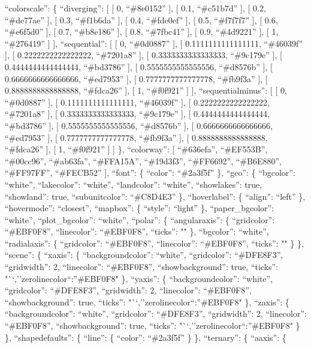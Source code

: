 \documentclass[
]{article}
\begin{document}
``colorscale'': \{ ``diverging'': {[} {[} 0, ``\#8e0152'' {]}, {[} 0.1,
``\#c51b7d'' {]}, {[} 0.2, ``\#de77ae'' {]}, {[} 0.3, ``\#f1b6da'' {]},
{[} 0.4, ``\#fde0ef'' {]}, {[} 0.5, ``\#f7f7f7'' {]}, {[} 0.6,
``\#e6f5d0'' {]}, {[} 0.7, ``\#b8e186'' {]}, {[} 0.8, ``\#7fbc41'' {]},
{[} 0.9, ``\#4d9221'' {]}, {[} 1, ``\#276419'' {]} {]}, ``sequential'':
{[} {[} 0, ``\#0d0887'' {]}, {[} 0.1111111111111111, ``\#46039f'' {]},
{[} 0.2222222222222222, ``\#7201a8'' {]}, {[} 0.3333333333333333,
``\#9c179e'' {]}, {[} 0.4444444444444444, ``\#bd3786'' {]}, {[}
0.5555555555555556, ``\#d8576b'' {]}, {[} 0.6666666666666666,
``\#ed7953'' {]}, {[} 0.7777777777777778, ``\#fb9f3a'' {]}, {[}
0.8888888888888888, ``\#fdca26'' {]}, {[} 1, ``\#f0f921'' {]} {]},
``sequentialminus'': {[} {[} 0, ``\#0d0887'' {]}, {[}
0.1111111111111111, ``\#46039f'' {]}, {[} 0.2222222222222222,
``\#7201a8'' {]}, {[} 0.3333333333333333, ``\#9c179e'' {]}, {[}
0.4444444444444444, ``\#bd3786'' {]}, {[} 0.5555555555555556,
``\#d8576b'' {]}, {[} 0.6666666666666666, ``\#ed7953'' {]}, {[}
0.7777777777777778, ``\#fb9f3a'' {]}, {[} 0.8888888888888888,
``\#fdca26'' {]}, {[} 1, ``\#f0f921'' {]} {]} \}, ``colorway'': {[}
``\#636efa'', ``\#EF553B'', ``\#00cc96'', ``\#ab63fa'', ``\#FFA15A'',
``\#19d3f3'', ``\#FF6692'', ``\#B6E880'', ``\#FF97FF'', ``\#FECB52''
{]}, ``font'': \{ ``color'': ``\#2a3f5f'' \}, ``geo'': \{ ``bgcolor'':
``white'', ``lakecolor'': ``white'', ``landcolor'': ``white'',
``showlakes'': true, ``showland'': true, ``subunitcolor'': ``\#C8D4E3''
\}, ``hoverlabel'': \{ ``align'': ``left'' \}, ``hovermode'':
``closest'', ``mapbox'': \{ ``style'': ``light'' \}, ``paper\_bgcolor'':
``white'', ``plot\_bgcolor'': ``white'', ``polar'': \{ ``angularaxis'':
\{ ``gridcolor'': ``\#EBF0F8'', ``linecolor'': ``\#EBF0F8'', ``ticks'':
"" \}, ``bgcolor'': ``white'', ``radialaxis'': \{ ``gridcolor'':
``\#EBF0F8'', ``linecolor'': ``\#EBF0F8'', ``ticks'': "" \} \},
``scene'': \{ ``xaxis'': \{ ``backgroundcolor'': ``white'',
``gridcolor'': ``\#DFE8F3'', ``gridwidth'': 2, ``linecolor'':
``\#EBF0F8'', ``showbackground'': true, ``ticks'':
"``,''zerolinecolor``:''\#EBF0F8" \}, ``yaxis'': \{ ``backgroundcolor'':
``white'', ``gridcolor'': ``\#DFE8F3'', ``gridwidth'': 2, ``linecolor'':
``\#EBF0F8'', ``showbackground'': true, ``ticks'':
"``,''zerolinecolor``:''\#EBF0F8" \}, ``zaxis'': \{ ``backgroundcolor'':
``white'', ``gridcolor'': ``\#DFE8F3'', ``gridwidth'': 2, ``linecolor'':
``\#EBF0F8'', ``showbackground'': true, ``ticks'':
"``,''zerolinecolor``:''\#EBF0F8" \} \}, ``shapedefaults'': \{ ``line'':
\{ ``color'': ``\#2a3f5f'' \} \}, ``ternary'': \{ ``aaxis'': \{
\end{document}
